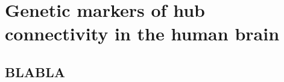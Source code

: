 \chapter{Genetic markers of hub connectivity in the human brain}

\section{BLABLA}
\label{app:AppendixCh5_1}

